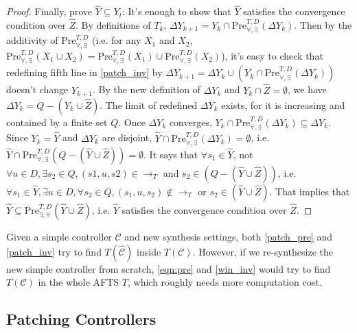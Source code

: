 \begin{proof}
	Finally, prove $ \widehat{Y}\subseteq Y_t $: It's enough to show that $ \widehat{Y} $ satisfies the convergence condition over $ \widehat{Z} $. By definitions of $ T_k $, $ \Delta Y_{k+1}= Y_k \cap \text{Pre}_{\forall,\exists}^{T, D}(\Delta Y_k)$. Then by the additivity of $ \text{Pre}^{T,D}_{\forall,\exists} $ (i.e. for any $ X_1 $ and $ X_2 $, $ \text{Pre}_{\forall,\exists}^{T,D} (X_1\cup X_2)=\text{Pre}_{\forall,\exists}^{T,D} (X_1)\cup \text{Pre}_{\forall,\exists}^{T,D} (X_2) $), it's easy to check that redefining fifth line in \eqref{patch_inv} by $ \Delta Y_{k+1} = \Delta Y_k \cup (Y_k \cap \text{Pre}_{\forall,\exists}^{T, D}(\Delta Y_k)) $ doesn't change $ Y_{k+1} $.  By the new definition of $ \Delta Y_k $ and $ Y_k \cap \widehat{Z} = \emptyset $, we have $ \Delta Y_k = Q-(Y_k\cup \widehat{Z}) $. The limit of redefined $ \Delta Y_k $ exists, for it is increasing and contained by a finite set $ Q $. Once $ \Delta Y_k $ converges, $ Y_k \cap \text{Pre}_{\forall,\exists}^{T, D}(\Delta Y_k)\subseteq \Delta Y_k $. Since $ Y_k=\widehat{Y} $ and $ \Delta Y_k $ are disjoint, $ \widehat{Y} \cap \text{Pre}_{\forall,\exists}^{T, D}(\Delta Y_k) = \emptyset $, i.e.  $ \widehat{Y} \cap \text{Pre}_{\forall,\exists}^{T, D}(Q-(\widehat{Y}\cup \widehat{Z})) = \emptyset $. It says that $ \forall s_1 \in \widehat{Y}$, not $\forall u\in D, \exists s_2\in Q, (s1,u,s2)\in \rightarrow_{T} $ and $s_2\in (Q-(\widehat{Y}\cup \widehat{Z}))$, i.e. $ \forall s_1 \in \widehat{Y}, \exists u\in D, \forall s_2 \in Q,  (s_1,u,s_2)\not\in \rightarrow_{T}$ or $ s_2\in (\widehat{Y}\cup \widehat{Z})$. That implies that $ \widehat{Y}\subseteq \text{Pre}_{\exists,\forall}^{T,D}(\widehat{Y}\cup \widehat{Z}) $, i.e. $ \widehat{Y} $ satisfies the convergence condition over $ \widehat{Z} $.
\end{proof}

Given a simple controller $ \mathcal{C} $ and new synthesis settings, both \eqref{patch_pre} and \eqref{patch_inv} try to find $ T(\widehat{\mathcal{C}}) $ inside $ T(\mathcal{C}) $. However, if we re-synthesize the new simple controller from scratch, \eqref{eqn:pre} and \eqref{win_inv} would try to find $ T(\mathcal{C}) $ in the whole AFTS $ T $, which roughly needs more computation cost.

\subsection{Patching Controllers}


